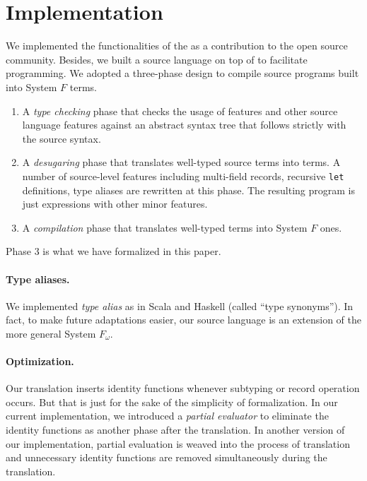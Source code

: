 \section{Implementation}

We implemented the functionalities of the \name as a contribution to the open
source community. Besides, we built a source language on top of \name to
facilitate programming. We adopted a three-phase design to compile source
programs built into System $F$ terms.
\begin{enumerate}
\item A \emph{type checking} phase that checks the usage of \name features and
  other source language features against an abstract syntax tree that follows
  strictly with the source syntax.

\item A \emph{desugaring} phase that translates well-typed source terms into
  \name terms. A number of source-level features including multi-field records,
  recursive \texttt{let} definitions, type aliases are rewritten at this phase.
  The resulting program is just \name expressions with other minor features.

\item A \emph{compilation} phase that translates well-typed \name terms into
  System $F$ ones.
\end{enumerate}
Phase 3 is what we have formalized in this paper.

\paragraph{Type aliases.} We implemented \emph{type alias} as in Scala and
Haskell (called ``type synonyms''). In fact, to make future adaptations easier,
our source language is an extension of the more general System $F_{\omega}$.

\paragraph{Optimization.} Our translation inserts identity functions whenever
subtyping or record operation occurs. But that is just for the sake of the
simplicity of formalization. In our current implementation, we introduced a
\emph{partial evaluator} to eliminate the identity functions as another phase
after the translation. In another version of our implementation, partial
evaluation is weaved into the process of translation and unnecessary identity
functions are removed simultaneously during the translation.
